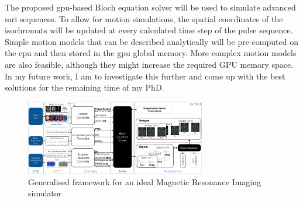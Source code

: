 \hfill

The proposed \ac{gpu}-based Bloch equation solver will be used to simulate advanced \ac{mri} sequences.
To allow for motion simulations, the spatial coordinates of the isochromats will be updated at every calculated time step of the pulse sequence.
Simple motion models that can be described analytically will be pre-computed on the \ac{cpu} and then stored in the \ac{gpu} global memory.
More complex motion models are also feasible, although they might increase the required GPU memory space.
In my future work, I am to investigate this further and come up with the best solutions for the remaining time of my PhD.


\begin{figure}[ht]
    \centering
    \includegraphics[angle=90,width=0.7\textwidth, keepaspectratio]{images/mri/globalFramework}
    \caption{Generalised framework for an ideal Magnetic Resonance Imaging simulator}
    \label{fig:globalFramework}
\end{figure}